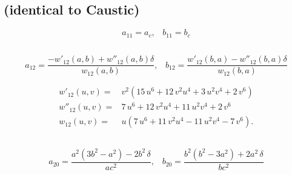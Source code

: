 \subsection{ (identical to Caustic)}
 
\begin{equation*}
    a_{11}=a_c,\;\;\;b_{11}=b_c
\end{equation*}

\subsection{}
\begin{equation*}
    a_{12}=\frac{ - w'_{12} (a,b)+ w''_{12}(a,b) \delta}{ w_{12} (a,b)},\;\;\;b_{12}=\frac{   w'_{12}(b,a)-w''_{12}(b,a)\delta}{ w_{12}(b,a)}
\end{equation*}

\begin{align*}
w'_{12}(u,v)=&
		  v^2(15\,{u}^{6}+12\,{v}^{2}{u}^{4}+3\,{u}^{2}{v}^{4}+2\,{v}^{6})\\
w''_{12}(u,v)= & 7\,{u}^{6}+12\,{v}^{2}{u}^{4}+11\,{u}^{2}{v}^{4}+2\,{v}^{6}  \\
w_{12}(u,v)=&  u( 7\,{u}^{6}+11\,{v}^{2}{u}^{4}-11\,{u}^{2}{v}^{4}-7\,{v}^{6}).
%
\end{align*} 
 
\subsection{}

\begin{equation*}
a_{20}=     {\frac{{a}^{2} \left(3b^2- {a}^{2}  \right) -2b^2\,\delta }{ ac^2}}, \;\;\;
b_{20}=   {\frac{{b}^{2} \left(  {b}^{2} -3a^2\right) +2a^2\,\delta}{b c^2 }}
\end{equation*}

\subsection{}


